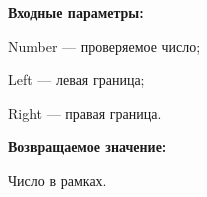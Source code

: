 \textbf{Входные параметры:}  
 
Number --- проверяемое число;
 
Left --- левая граница;
 
Right --- правая граница.

\textbf{Возвращаемое значение:}
 
Число в рамках.